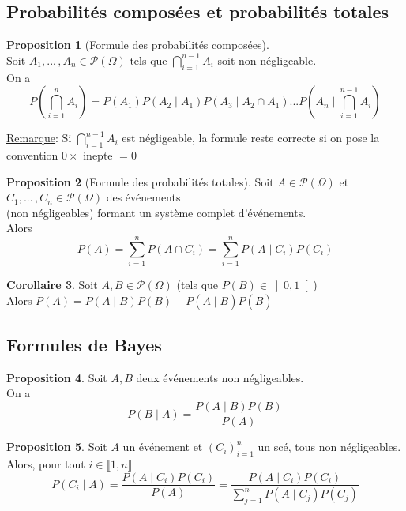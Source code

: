 \documentclass[10pt,a4paper]{article}
\theoremstyle{definition}
\newtheorem{proposition}{Proposition}[section]
\newtheorem{corollaire}[proposition]{Corollaire}
\begin{document}
\subsection{Probabilités composées et probabilités totales}
\begin{proposition}[Formule des probabilités composées]
\hfill \\
Soit $A_1, ...\,, A_n \in \mathcal{P}(\Omega)$ tels que $\bigcap\limits_{i = 1}^{n - 1} A_i$ soit non négligeable. \\
On a 
\[ P\left( \bigcap\limits_{i = 1}^n A_i \right) = P(A_1) P(A_2 \mid A_1) P(A_3 \mid A_2 \cap A_1) ... P\left( A_n \mid \bigcap\limits_{i = 1}^{n - 1} A_i \right) \]
\end{proposition}
\noindent \uline{Remarque}: Si $\bigcap\limits_{i = 1}^{n - 1} A_i$ est négligeable, la formule reste correcte si on pose la convention $0 \times $ inepte $= 0$
\begin{proposition}[Formule des probabilités totales]
Soit $A \in \mathcal{P}(\Omega)$ et $C_1, ...\,, C_n \in \mathcal{P}(\Omega)$ des événements \\
(non négligeables) formant un système complet d'événements. \\
Alors 
\[ P(A) = \sum_{i = 1}^n P(A \cap C_i) = \sum_{i = 1}^n P(A \mid C_i) P(C_i) \]
\end{proposition} 
\begin{corollaire}
Soit $A, B \in \mathcal{P}(\Omega)$ (tels que $P(B) \in \left] 0, 1 \right[$) \\
Alors $P(A) = P(A \mid B) P(B) + P(A \mid \overline{B}) P(\overline{B})$
\end{corollaire}

\subsection{Formules de Bayes}
\begin{proposition}
Soit $A, B$ deux événements non négligeables. \\
On a
\[P(B \mid A) = \frac{P(A \mid B) P(B)}{P(A)}\]
\end{proposition}
\begin{proposition}
Soit $A$ un événement et $(C_i)_{i = 1}^n$ un scé, tous non négligeables. \\
Alors, pour tout $i \in \llbracket 1, n \rrbracket$
\[P(C_i \mid A) = \frac{P(A \mid C_i)P(C_i)}{P(A)} = \frac{P(A \mid C_i)P(C_i)}{\sum\limits_{j = 1}^n P(A \mid C_j) P(C_j)} \]
\end{proposition}
\end{document}
